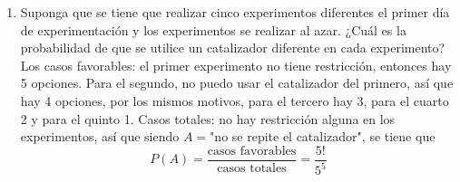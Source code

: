 \begin{enumerate}
\begin{center}
            \end{center}
        \item Suponga que se tiene que realizar cinco experimentos diferentes el primer día de experimentación y los experimentos se realizar al azar. ¿Cuál es la probabilidad de que se utilice un catalizador diferente en cada experimento?\e\\
            Los casos favorables: el primer experimento no tiene restricción, entonces hay 5 opciones. Para el segundo, no puedo usar el catalizador del primero, así que hay 4 opciones, por los mismos motivos, para el tercero hay 3, para el cuarto 2 y para el quinto 1. Casos totales: no hay restricción alguna en los experimentos, así que siendo $A=$"no se repite el catalizador", se tiene que\[P(A)=\frac{\text{casos favorables}}{\text{casos totales}}=\frac{5!}{5^5}\]
    \end{enumerate}